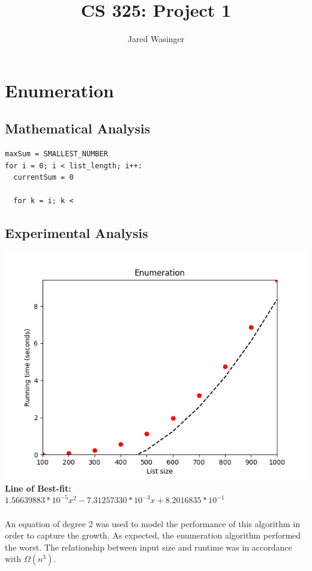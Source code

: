 \documentclass{article}
\begin{document}
\title{CS 325: Project 1}
\author{Jared Wasinger}

\maketitle

\section{Enumeration}
  \subsection{Mathematical Analysis}
    \begin{verbatim}
maxSum = SMALLEST_NUMBER
for i = 0; i < list_length; i++:
  currentSum = 0

  for k = i; k < 
    \end{verbatim}

  \subsection{Experimental Analysis}
    \includegraphics{enumeration.png}
    \textbf{Line of Best-fit:}\\
    $1.56639883*10^{-5}x^2 - 7.31257330*10^{-3}x + 8.2016835*10^{-1}$\\\\

    An equation of degree 2 was used to model the performance of this algorithm in order to capture the growth.  As expected, the enumeration algorithm performed the worst.  The relationship between input size and runtime was in accordance with $\Omega(n^3)$.\\
\end{document}
